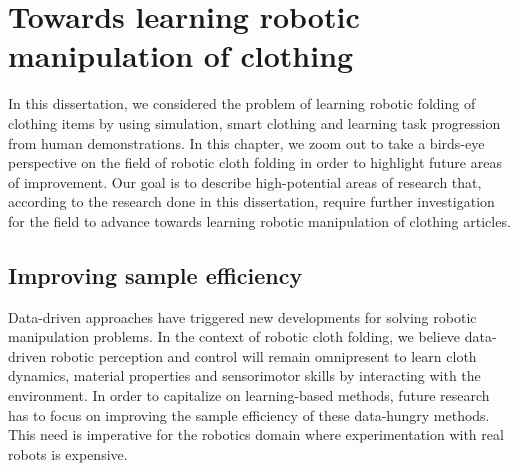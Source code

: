 \documentclass[\home/main.tex]{subfiles}
\begin{document}
\chapter{Towards learning robotic manipulation of clothing} \label{ch:towards_robotic_folding}
In this dissertation, we considered the problem of learning robotic folding of clothing items by using simulation, smart clothing and learning task progression from human demonstrations. In this chapter, we zoom out to take a birds-eye perspective on the field of robotic cloth folding in order to highlight future areas of improvement. Our goal is to describe high-potential areas of research that, according to the research done in this dissertation, require further investigation for the field to advance towards learning robotic manipulation of clothing articles.

\section{Improving sample efficiency}

Data-driven approaches have triggered new developments for solving robotic manipulation problems. In the context of robotic cloth folding, we believe data-driven robotic perception and control will remain omnipresent to learn cloth dynamics, material properties and sensorimotor skills by interacting with the environment. In order to capitalize on learning-based methods, future research has to focus on improving the sample efficiency of these data-hungry methods. This need is imperative for the robotics domain where experimentation with real robots is expensive. 
\end{document}
